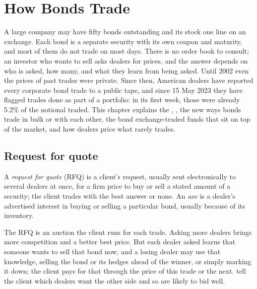 \chapter{How Bonds Trade}\label{ch:m2:how-bonds-trade}

A large company may have fifty bonds outstanding and its stock one line on an
exchange. Each bond is a separate security with its own coupon and maturity, and
most of them do not trade on most days. There is no order book to consult; an
investor who wants to sell asks dealers for prices, and the answer depends on who
is asked, how many, and what they learn from being asked. Until 2002 even the
prices of past trades were private. Since then, American dealers have reported
every corporate bond trade to a public tape, and since 15 May 2023 they have
flagged trades done as part of a portfolio: in its first week, those were already
5.2\% of the notional traded. This chapter explains the , , the new ways bonds trade in bulk or with each other, the bond
exchange-traded funds that sit on top of the market, and how dealers price what
rarely trades.

\section{Request for quote}

\begin{definition}\label{def:m2:how-bonds-trade:rfq}
A \emph{request for quote} (RFQ) is a client's request,
usually sent electronically to several dealers at once, for a firm price to buy or
sell a stated amount of a security; the client trades with the best answer or
none. An \emph{axe} is a dealer's advertised interest in buying or
selling a particular bond, usually because of its inventory.
\end{definition}

The RFQ is an auction the client runs for each trade. Asking more dealers brings
more competition and a better best price. But each dealer asked learns that someone
wants to sell that bond now, and a losing dealer may use that knowledge, selling
the bond or its hedges ahead of the winner, or simply marking it down; the client
pays for that through the price of this trade or the next.  tell the client
which dealers want the other side and so are likely to bid well.

